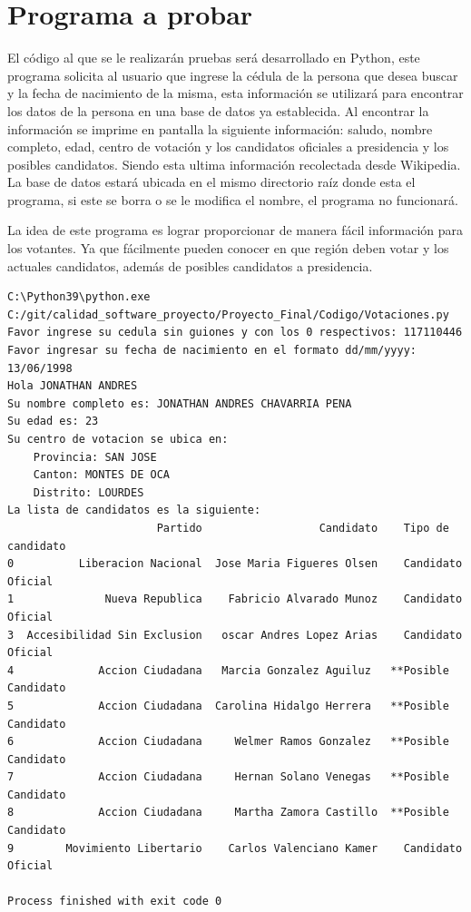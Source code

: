 \documentclass[conference]{IEEEtran}
\begin{document}
\section{Programa a probar}

El código al que se le realizarán pruebas será desarrollado en Python, este programa solicita al usuario que ingrese la cédula de la persona que desea buscar y la fecha de nacimiento de la misma, esta información se utilizará para encontrar los datos de la persona en una base de datos ya establecida. Al encontrar la información se imprime en pantalla la siguiente información: saludo, nombre completo, edad, centro de votación y los candidatos oficiales a presidencia y los posibles candidatos. Siendo esta ultima información recolectada desde Wikipedia. La base de datos estará ubicada en el mismo directorio raíz donde esta el programa, si este se borra o se le modifica el nombre, el programa no funcionará.

La idea de este programa es lograr proporcionar de manera fácil información para los votantes. Ya que fácilmente pueden conocer en que región deben votar y los actuales candidatos, además de posibles candidatos a presidencia.


\begin{lstlisting}[style=CMD_small]
C:\Python39\python.exe C:/git/calidad_software_proyecto/Proyecto_Final/Codigo/Votaciones.py
Favor ingrese su cedula sin guiones y con los 0 respectivos: 117110446
Favor ingresar su fecha de nacimiento en el formato dd/mm/yyyy: 13/06/1998
Hola JONATHAN ANDRES
Su nombre completo es: JONATHAN ANDRES CHAVARRIA PENA
Su edad es: 23
Su centro de votacion se ubica en:
	Provincia: SAN JOSE
	Canton: MONTES DE OCA
	Distrito: LOURDES
La lista de candidatos es la siguiente:
                       Partido                  Candidato    Tipo de candidato
0          Liberacion Nacional  Jose Maria Figueres Olsen    Candidato Oficial
1              Nueva Republica    Fabricio Alvarado Munoz    Candidato Oficial
3  Accesibilidad Sin Exclusion   oscar Andres Lopez Arias    Candidato Oficial
4             Accion Ciudadana   Marcia Gonzalez Aguiluz   **Posible Candidato
5             Accion Ciudadana  Carolina Hidalgo Herrera   **Posible Candidato
6             Accion Ciudadana     Welmer Ramos Gonzalez   **Posible Candidato
7             Accion Ciudadana     Hernan Solano Venegas   **Posible Candidato
8             Accion Ciudadana     Martha Zamora Castillo  **Posible Candidato
9        Movimiento Libertario    Carlos Valenciano Kamer    Candidato Oficial

Process finished with exit code 0
\end{lstlisting}
\end{document}
